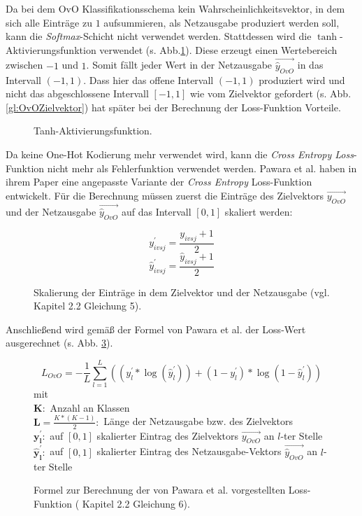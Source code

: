 Da bei dem OvO Klassifikationsschema kein Wahrscheinlichkeitsvektor, in dem sich alle Einträge zu $1$ aufsummieren, als Netzausgabe produziert werden soll, kann die \textit{Softmax}-Schicht nicht verwendet werden. Stattdessen wird die $\tanh$-Aktivierungsfunktion verwendet (s. Abb.\ref{fig:tanh}). Diese erzeugt einen Wertebereich zwischen $-1$ und $1$. Somit fällt jeder Wert in der Netzausgabe $\overrightarrow{\widehat{y}_{OvO}}$ in das Intervall $(-1, 1)$. Dass hier das offene Intervall $(-1, 1)$ produziert wird und nicht das abgeschlossene Intervall $[-1, 1]$ wie vom Zielvektor gefordert (s. Abb. \ref{gl:OvOZielvektor}) hat später bei der Berechnung der Loss-Funktion Vorteile.

\begin{figure}[H]
\begin{adjustbox}{width=.65\textwidth, center}

\end{adjustbox}
\caption{Tanh-Aktivierungsfunktion.}
\label{fig:tanh}
\end{figure}

Da keine One-Hot Kodierung mehr verwendet wird, kann die \textit{Cross Entropy Loss}-Funktion nicht mehr als Fehlerfunktion verwendet werden. Pawara et al. haben in ihrem Paper \cite{pawaraPaper} eine angepasste Variante der \textit{Cross Entropy} Loss-Funktion entwickelt. Für die Berechnung müssen zuerst die Einträge des Zielvektors $\overrightarrow{y_{OvO}}$ und der Netzausgabe $\overrightarrow{\widehat{y}_{OvO}}$ auf das Intervall $[0, 1]$ skaliert werden:
\begin{figure}[H]
\[y_{ivsj}^{'} = \frac{y_{ivsj} + 1}{2}\]
\[\widehat{y}_{ivsj}^{'} = \frac{\widehat{y}_{ivsj} + 1}{2}\]
\caption{Skalierung der Einträge in dem Zielvektor und der Netzausgabe (vgl. \cite{pawaraPaper} Kapitel 2.2 Gleichung 5).}
\label{gl:pawaraSkalierung}
\end{figure}

Anschließend wird gemäß der Formel von Pawara et al. der Loss-Wert ausgerechnet (s. Abb. \ref{gl:pawaraLoss}).

\begin{figure}[H]
\[L_{OvO} = - \frac{1}{L} \sum_{l=1}^{L}((y_{l}^{'} * \log{(\widehat{y}_{l}^{'})}) + (1 - y_{l}^{'}) * \log{(1-\widehat{y}_{l}^{'})})\]
mit\\
$\boldsymbol{K}:$ Anzahl an Klassen\\

$\boldsymbol{L}=\frac{K*(K-1)}{2}:$ Länge der Netzausgabe bzw. des Zielvektors\\

$\boldsymbol{y_{l}^{'}}:$ auf $[0, 1]$ skalierter Eintrag des Zielvektors $\overrightarrow{y_{OvO}}$ an $l$-ter Stelle\\

$\boldsymbol{\widehat{y}_{l}^{'}}:$ auf $[0, 1]$ skalierter Eintrag des Netzausgabe-Vektors $\overrightarrow{\widehat{y}_{OvO}}$ an $l$-ter Stelle\\


\caption{Formel zur Berechnung der von Pawara et al. vorgestellten Loss-Funktion (\cite{pawaraPaper} Kapitel 2.2 Gleichung 6).}
\label{gl:pawaraLoss}
\end{figure}

